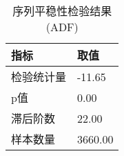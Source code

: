 \begin{table}[H]
    \caption{序列平稳性检验结果(ADF)}
    \label{adf-test}
    \begin{tabularx}{\textwidth}{YY}
    \toprule
    指标 & 取值 \\
    \midrule
    检验统计量 & -11.65 \\
    p值 & 0.00 \\
    滞后阶数 & 22.00 \\
    样本数量 & 3660.00 \\
    \bottomrule
    \end{tabularx}
    \end{table}
    